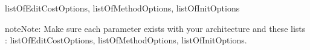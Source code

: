 \documentclass[letterpaper,10pt,english]{sphinxmanual}
\begin{document}
\begin{fulllineitems}
\begin{quote}
\begin{description}
\end{description}\end{quote}




listOfEditCostOptions, listOfMethodOptions, listOfInitOptions



\begin{notice}{note}{Note:}
Make sure each parameter exists with your architecture and these lists : listOfEditCostOptions, listOfMethodOptions, listOfInitOptions.
\end{notice}

\end{fulllineitems}

\end{document}
